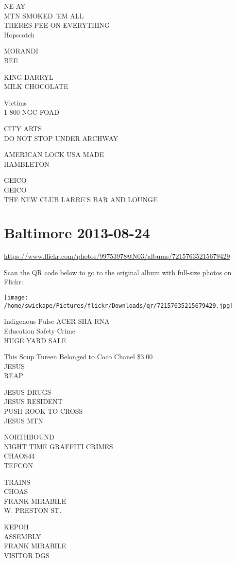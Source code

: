 \documentclass[10pt,letterpaper]{article}
\begin{document}
NE AY\\
MTN SMOKED 'EM ALL\\
THERES PEE ON EVERYTHING\\
Hopscotch

MORANDI\\
BEE

KING DARRYL\\
MILK CHOCOLATE

Victims\\
1{-}800{-}NGC{-}FOAD

CITY ARTS\\
DO NOT STOP UNDER ARCHWAY

AMERICAN LOCK USA MADE\\
HAMBLETON

GEICO\\
GEICO\\
THE NEW CLUB LARRE'S BAR AND LOUNGE


\section*{Baltimore 2013-08-24}

\url{https://www.flickr.com/photos/99753978@N03/albums/72157635215679429}

Scan the QR code below to go to the original album with full-size photos on Flickr:

\texttt{[image: /home/swickape/Pictures/flickr/Downloads/qr/72157635215679429.jpg]}


Indigenous Pulse ACER SHA RNA\\
Education Safety Crime\\
HUGE YARD SALE

This Soup Tureen Belonged to Coco Chanel \$3.00\\
JESUS\\
REAP

JESUS DRUGS\\
JESUS RESIDENT\\
PUSH ROOK TO CROSS\\
JESUS MTN

NORTHBOUND\\
NIGHT TIME GRAFFITI CRIMES\\
CHAOS44\\
TEFCON

TRAINS\\
CHOAS\\
FRANK MIRABILE\\
W. PRESTON ST.

KEPOH\\
ASSEMBLY\\
FRANK MIRABILE\\
VISITOR DGS
\end{document}
